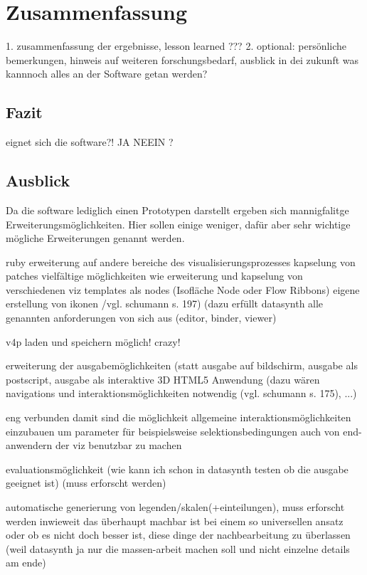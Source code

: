 \documentclass[a4paper, 12pt, DIVcalc, onepage, pdftex, headsepline, footsepline]{scrreprt}
\begin{document}
\chapter{Zusammenfassung}
\label{cha:Zusammenfassung}
1. zusammenfassung der ergebnisse, lesson learned
???
2. optional: persönliche bemerkungen, hinweis auf weiteren forschungsbedarf, ausblick in dei zukunft
was kannnoch alles an der Software getan werden?
\section{Fazit}
\label{sec:Fazit}
eignet sich die software?! JA NEEIN ?
\section{Ausblick}
\label{sec:Ausblick}
Da die software lediglich einen Prototypen darstellt ergeben sich mannigfalitge Erweiterungsmöglichkeiten. Hier sollen einige weniger, dafür aber sehr wichtige mögliche Erweiterungen genannt werden.

ruby
erweiterung auf andere bereiche des visualisierungsprozesses
kapselung von patches
  vielfältige möglichkeiten wie
    erweiterung und kapselung von verschiedenen viz templates als nodes (Isofläche Node oder Flow Ribbons)
    eigene erstellung von ikonen /vgl. schumann s. 197)
    (dazu erfüllt datasynth alle genannten anforderungen von sich aus (editor, binder, viewer)

v4p laden und speichern möglich! crazy!

erweiterung der ausgabemöglichkeiten (statt ausgabe auf bildschirm, ausgabe als postscript, ausgabe als interaktive 3D HTML5 Anwendung (dazu wären navigations und interaktionsmöglichkeiten notwendig (vgl. schumann s. 175), ...)

eng verbunden damit sind die möglichkeit allgemeine interaktionsmöglichkeiten einzubauen um parameter für beispielsweise selektionsbedingungen auch von end-anwendern der viz benutzbar zu machen

evaluationsmöglichkeit (wie kann ich schon in datasynth testen ob die ausgabe geeignet ist) (muss erforscht werden)

automatische generierung von legenden/skalen(+einteilungen), muss erforscht werden inwieweit das überhaupt machbar ist bei einem so universellen ansatz oder ob es nicht doch besser ist, diese dinge der nachbearbeitung zu überlassen (weil datasynth ja nur die massen-arbeit machen soll und nicht einzelne details am ende)
\end{document}
